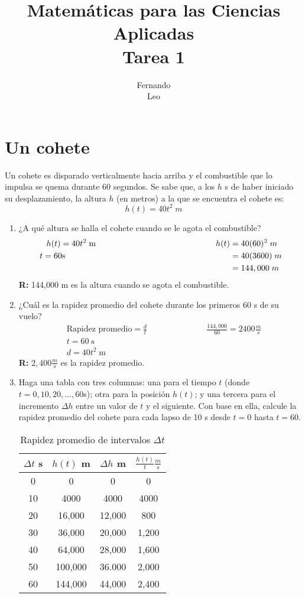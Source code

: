 \documentclass[12pt]{article}
\title{Matemáticas para las Ciencias Aplicadas \\ Tarea 1}
\date{}
\author{Fernando \\ Leo}
\begin{document}
\maketitle
\section{\large Un cohete}
Un cohete es disparado verticalmente hacia arriba y el combustible que lo impulsa se quema durante 60 segundos. Se sabe que, a los $h$ s de haber iniciado su desplazamiento, la altura $h$ (en metros) a la que se encuentra el cohete es: \[h(t) = 40 t^2 \; m\]
\begin{enumerate}
\item ¿A qué altura se halla el cohete cuando se le agota el combustible?
  \begin{align*}
    h(t)= 40t^2 \; \text{m} \hspace{5.1cm}    h(t)&=40(60)^2 \; m\\
t=60\text{s} \hspace{7cm}    &=40(3600) \; m\\
    &=144,000 \; m\\
  \end{align*}
  {\bf R:} 144,000 m es la altura cuando se agota el combustible.
\item ¿Cuál es la rapidez promedio del cohete durante los primeros 60 s de su vuelo?
  \begin{align*}
    &\text{Rapidez promedio}=\frac{d}{t} \hspace{3cm}\frac{144,000}{60}= 2400 \frac{m}{s}\\
    &t = 60\; \text{s} \\
    &d = 40t^2 \; \text{m} 
  \end{align*}
  {\bf R:} $2,400 \frac{m}{s}$ es la rapidez promedio.
\item Haga una tabla con tres columnas: una para el tiempo $t$ (donde $t = 0, 10, 20, . . . , 60 $s); otra para la posición $h(t)$; y una tercera para el incremento $\Delta h$ entre un valor de $t$ y el siguiente. Con base en ella, calcule la rapidez promedio del cohete para cada lapso de 10 s desde $t = 0$ hasta $t = 60$.
  \begin{table}[h]
\begin{center}
\begin{tabular}{| c | c | c |c|}\hline
  $\Delta t$ s & $h(t)$ m & $\Delta h$ m&$\frac{h(t)}{t}\frac{m}{s}$\\ \hline
0 & 0 & 0 &0 \\ 
10& 4000& 4000& 4000 \\
20&16,000&12,000&800\\
30&36,000&20,000&1,200\\
40&64,000&28,000&1,600\\
50&100,000&36.000&2,000\\
60& 144,000& 44,000& 2,400 \\ \hline
\end{tabular}
\caption{Rapidez promedio de intervalos $\Delta t$}
\label{tab:rapprom}
\end{center}
\end{table}


\end{enumerate}
\end{document}

